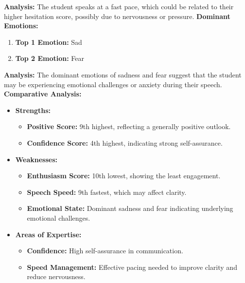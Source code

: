 \documentclass{article}
\begin{document}
    \textbf{Analysis:} The student speaks at a fast pace, which could be related to their higher hesitation score, possibly due to nervousness or pressure.
    \vspace{0.1in}
\large{\textbf{Dominant Emotions:}}
\begin{tcolorbox}[colback=pink!10!white, colframe=pink!80!black, title=Emotional State]
    \begin{enumerate}
        \item \textbf{Top 1 Emotion:} \textcolor{blue!80!black}{Sad}
        \item \textbf{Top 2 Emotion:} \textcolor{red!80!black}{Fear}
    \end{enumerate}
\end{tcolorbox}
    \textbf{Analysis:} The dominant emotions of sadness and fear suggest that the student may be experiencing emotional challenges or anxiety during their speech.
    \vspace{0.2in}
\textbf{Comparative Analysis:}
\begin{itemize}
    \item \textbf{Strengths:}
    \begin{itemize}
        \item \textbf{Positive Score:} 9th highest, reflecting a generally positive outlook.
        \item \textbf{Confidence Score:} 4th highest, indicating strong self-assurance.
    \end{itemize}
    \item \textbf{Weaknesses:}
    \begin{itemize}
        \item \textbf{Enthusiasm Score:} 10th lowest, showing the least engagement.
        \item \textbf{Speech Speed:} 9th fastest, which may affect clarity.
        \item \textbf{Emotional State:} Dominant sadness and fear indicating underlying emotional challenges.
    \end{itemize}
    \item \textbf{Areas of Expertise:}
    \begin{itemize}
        \item \textbf{Confidence:} High self-assurance in communication.
        \item \textbf{Speed Management:} Effective pacing needed to improve clarity and reduce nervousness.
    \end{itemize}
\end{itemize}
\end{document}
